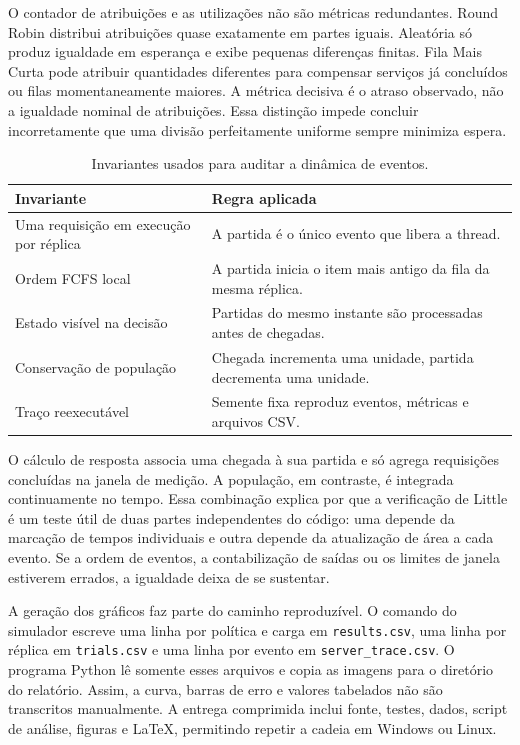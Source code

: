 \documentclass[conference]{IEEEtran}
\begin{document}
O contador de atribuições e as utilizações não são métricas redundantes. Round Robin distribui atribuições quase exatamente em partes iguais. Aleatória só produz igualdade em esperança e exibe pequenas diferenças finitas. Fila Mais Curta pode atribuir quantidades diferentes para compensar serviços já concluídos ou filas momentaneamente maiores. A métrica decisiva é o atraso observado, não a igualdade nominal de atribuições. Essa distinção impede concluir incorretamente que uma divisão perfeitamente uniforme sempre minimiza espera.

\begin{table}[!t]
\caption{Invariantes usados para auditar a dinâmica de eventos.}
\label{tab:invariants}
\centering
\scriptsize
\begin{tabular}{p{}p{}}
\toprule
Invariante & Regra aplicada \\
\midrule
Uma requisição em execução por réplica & A partida é o único evento que libera a thread. \\
Ordem FCFS local & A partida inicia o item mais antigo da fila da mesma réplica. \\
Estado visível na decisão & Partidas do mesmo instante são processadas antes de chegadas. \\
Conservação de população & Chegada incrementa uma unidade, partida decrementa uma unidade. \\
Traço reexecutável & Semente fixa reproduz eventos, métricas e arquivos CSV. \\
\bottomrule
\end{tabular}
\end{table}

O cálculo de resposta associa uma chegada à sua partida e só agrega requisições concluídas na janela de medição. A população, em contraste, é integrada continuamente no tempo. Essa combinação explica por que a verificação de Little é um teste útil de duas partes independentes do código: uma depende da marcação de tempos individuais e outra depende da atualização de área a cada evento. Se a ordem de eventos, a contabilização de saídas ou os limites de janela estiverem errados, a igualdade deixa de se sustentar.

A geração dos gráficos faz parte do caminho reproduzível. O comando do simulador escreve uma linha por política e carga em \texttt{results.csv}, uma linha por réplica em \texttt{trials.csv} e uma linha por evento em \texttt{server\_trace.csv}. O programa Python lê somente esses arquivos e copia as imagens para o diretório do relatório. Assim, a curva, barras de erro e valores tabelados não são transcritos manualmente. A entrega comprimida inclui fonte, testes, dados, script de análise, figuras e LaTeX, permitindo repetir a cadeia em Windows ou Linux.
\end{document}
